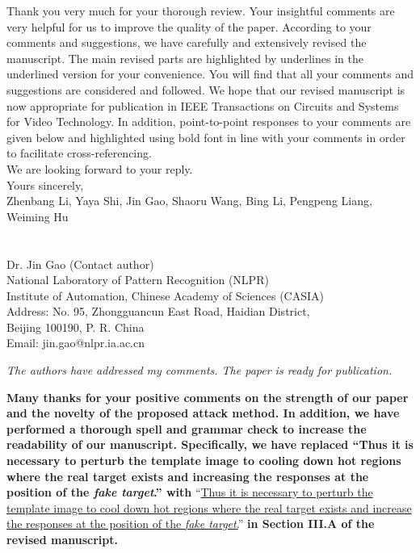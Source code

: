 \documentclass[12pt]{article}
\begin{document}
Thank you very much for your thorough review. Your insightful comments are very helpful for us to improve the quality of the paper. According to your comments and suggestions, we have carefully and extensively revised the manuscript. The main revised parts are highlighted by underlines in the underlined version for your convenience. You will find that all your comments and suggestions are considered and followed. We hope that our revised manuscript is now appropriate for publication in IEEE Transactions on Circuits and Systems for Video Technology.
In addition, point-to-point responses to your comments are given below and highlighted using bold font in line with your comments in order to facilitate cross-referencing.\\[10pt]
\indent We are looking forward to your reply.\\[10pt]
\noindent Yours sincerely,\\
\noindent Zhenbang Li, Yaya Shi, Jin Gao, Shaoru Wang, Bing Li, Pengpeng Liang, Weiming Hu
\\
\\
\\
\noindent Dr. Jin Gao (Contact author)\\
\noindent National Laboratory of Pattern Recognition (NLPR)\\
\noindent Institute of Automation, Chinese Academy of Sciences (CASIA)\\
\noindent Address: No. 95, Zhongguancun East Road, Haidian District,\\
\noindent Beijing 100190, P. R. China\\
\noindent Email: jin.gao@nlpr.ia.ac.cn

\newpage
\textit{The authors have addressed my comments. The paper is ready for publication.}

\textbf{Many thanks for your positive comments on the strength of our paper and the novelty of the proposed attack method. In addition, we have performed a thorough spell and grammar check to increase the readability of our manuscript. Specifically, we have replaced ``Thus it is necessary to perturb the template image to cooling down hot regions where the real target exists and increasing the responses at the position of the \textit{fake target}.'' with} ``\uline{Thus it is necessary to perturb the template image to cool down hot regions where the real target exists and increase the responses at the position of the \textit{fake target}.}''
\textbf{in Section III.A of the revised manuscript.}
\end{document}
